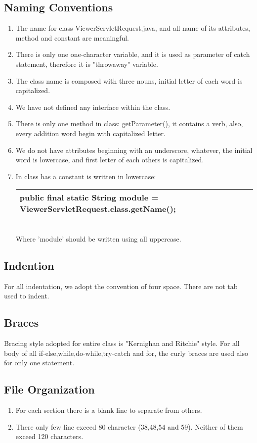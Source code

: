 \documentclass{article}
\begin{document}
\subsection{Naming Conventions}
\begin{enumerate}
\item 
The name for class ViewerServletRequest.java, and all name of its attributes, method and constant are meaningful.
\item
There is only one one-character variable, and it is used as parameter of catch statement, therefore it is "throwaway" variable.
\item
The class name is composed with three nouns, initial letter of each word is capitalized.
\item
We have not defined any interface within the class.
\item 
There is only one method in class: getParameter(), it contains a verb, also, every addition word begin with capitalized letter.
\item
We do not have attributes beginning with an underscore, whatever, the initial word is lowercase, and first letter of each others is capitalized.
\item
In class has a constant is written in lowercase:
\begin{table}[hpb]
\label{my-label}
\begin{tabular}{|l|}
\hline
public final static String module = ViewerServletRequest.class.getName();\\
\hline
\end{tabular}
\end{table} 
\\Where 'module' should be written using all uppercase.
\end{enumerate}

\subsection{Indention}
For all indentation, we adopt the convention of four space. There are not tab used to indent. 
\subsection{Braces}
Bracing style adopted for entire class is "Kernighan and Ritchie" style. For all body of all if-else,while,do-while,try-catch and for, the curly braces are used also for only one statement.
\subsection{File Organization}
\begin{enumerate}
\item
For each section there is a blank line to separate from others.
\item
There only few line exceed 80 character (38,48,54 and 59). Neither of them exceed 120 characters.
\end{enumerate}
\end{document}
